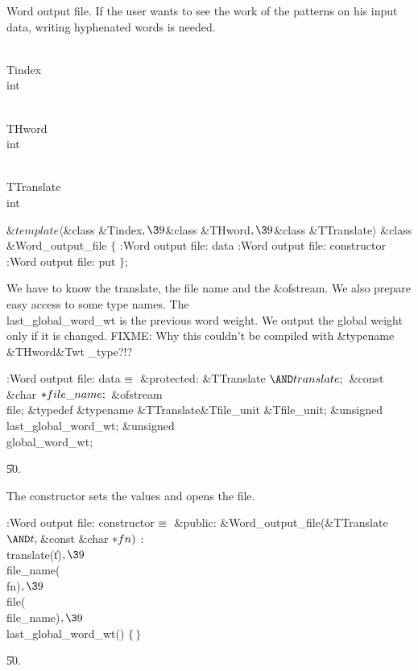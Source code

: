 Word output file. If the user wants to see the work of the patterns
on his input data, writing hyphenated words is needed.

\Y\B\F\\{Tindex} \5
\\{int}\par
\B\F\\{THword} \5
\\{int}\par
\B\F\\{TTranslate} \5
\\{int}\par
\Y\B$\&{template}\langle{}$\&{class} \&{Tindex}${},\39{}$\&{class} %
\&{THword}${},\39{}$\&{class} \&{TTranslate}${}\rangle{}$\6
\&{class} \&{Word\_output\_file} ${}\{{}$\1\6
:Word output file: data\X\6
:Word output file: constructor\X\6
:Word output file: put\X\2\6
${}\}{}$;\par
\fi

We have to know the translate, the file name and the \&{ofstream}. We
also prepare easy access to some type names.
The \\{last\_global\_word\_wt} is the previous word weight. We output the
global
weight only if it is changed.
FIXME: Why this couldn't be compiled with \&{typename} \&{THword}\DC\&{Twt%
\_type}?!?

\Y\B\4:Word output file: data\X${}\equiv{}$\6
\4\&{protected}:\6
\&{TTranslate} ${}{\AND}\\{translate};{}$\6
\&{const} \&{char} ${}{*}\\{file\_name};{}$\6
\&{ofstream} \\{file};\6
\&{typedef} \&{typename} \&{TTranslate}\DC\&{Tfile\_unit} \&{Tfile\_unit};\6
\&{unsigned} \\{last\_global\_word\_wt};\6
\&{unsigned} \\{global\_word\_wt};\par
\U50.\fi

The constructor sets the values and opens the file.

\Y\B\4:Word output file: constructor\X${}\equiv{}$\6
\4\&{public}:\6
\&{Word\_output\_file}(\&{TTranslate} ${}{\AND}\|t,\39{}$\&{const} \&{char}
${}{*}\\{fn}){}$\1\1\2\2\6
: \\{translate}(\|t)${},\39{}$ \\{file\_name}(\\{fn})${},\39{}$ \\{file}(%
\\{file\_name})${},\39{}$ \\{last\_global\_word\_wt}() ${}\{\,\}{}$\par
\U50.\fi

